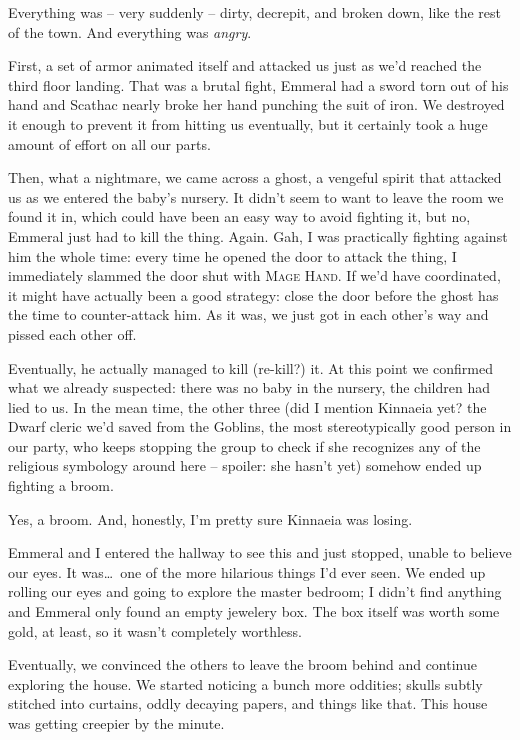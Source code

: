 Everything was -- very suddenly -- dirty, decrepit, and broken down, like the rest of the town. And everything was \emph{angry}.

First, a set of armor animated itself and attacked us just as we'd reached the third floor landing. That was a brutal fight, Emmeral had a sword torn out of his hand and Scathac nearly broke her hand punching the suit of iron. We destroyed it enough to prevent it from hitting us eventually, but it certainly took a huge amount of effort on all our parts.

Then, what a nightmare, we came across a ghost, a vengeful spirit that attacked us as we entered the baby's nursery. It didn't seem to want to leave the room we found it in, which could have been an easy way to avoid fighting it, but no, Emmeral just had to kill the thing. Again. Gah, I was practically fighting against him the whole time: every time he opened the door to attack the thing, I immediately slammed the door shut with \textsc{Mage Hand}. If we'd have coordinated, it might have actually been a good strategy: close the door before the ghost has the time to counter-attack him. As it was, we just got in each other's way and pissed each other off.

Eventually, he actually managed to kill (re-kill?) it. At this point we confirmed what we already suspected: there was no baby in the nursery, the children had lied to us. In the mean time, the other three (did I mention Kinnaeia yet? the Dwarf cleric we'd saved from the Goblins, the most stereotypically good person in our party, who keeps stopping the group to check if she recognizes any of the religious symbology around here -- spoiler: she hasn't yet) somehow ended up fighting a broom.

Yes, a broom. And, honestly, I'm pretty sure Kinnaeia was losing.

Emmeral and I entered the hallway to see this and just stopped, unable to believe our eyes. It was\dots\ one of the more hilarious things I'd ever seen. We ended up rolling our eyes and going to explore the master bedroom; I didn't find anything and Emmeral only found an empty jewelery box. The box itself was worth some gold, at least, so it wasn't completely worthless.

Eventually, we convinced the others to leave the broom behind and continue exploring the house. We started noticing a bunch more oddities; skulls subtly stitched into curtains, oddly decaying papers, and things like that. This house was getting creepier by the minute.

